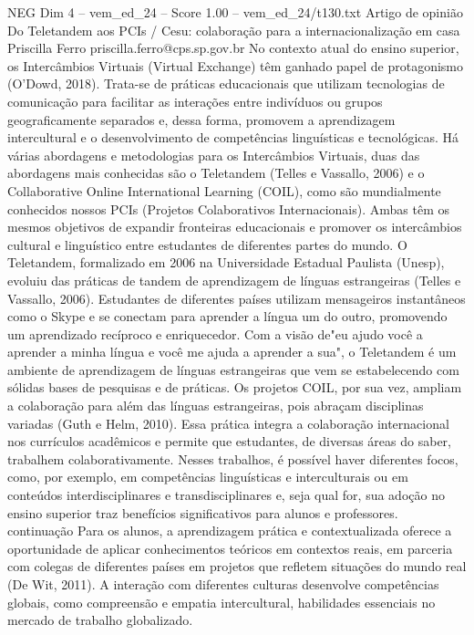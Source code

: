 \begin{textsample}{NEG Dim 4 – vem\_ed\_24 – Score 1.00 – vem\_ed\_24/t130.txt}  \label{ex:f4_neg_063}
Artigo de opinião Do Teletandem aos PCIs / Cesu: colaboração para a internacionalização em casa Priscilla Ferro priscilla.ferro@cps.sp.gov.br No contexto atual do ensino superior, os Intercâmbios Virtuais (Virtual Exchange) têm ganhado papel de protagonismo (O'Dowd, 2018).
Trata-se de práticas educacionais que utilizam tecnologias de comunicação para facilitar as interações entre indivíduos ou grupos geograficamente separados e, dessa forma, promovem a aprendizagem intercultural e o desenvolvimento de competências linguísticas e tecnológicas.
Há várias abordagens e metodologias para os Intercâmbios Virtuais, duas das abordagens mais conhecidas são o Teletandem (Telles e Vassallo, 2006) e o Collaborative Online International Learning (COIL), como são mundialmente conhecidos nossos PCIs (Projetos Colaborativos Internacionais).
Ambas têm os mesmos objetivos de expandir fronteiras educacionais e promover os intercâmbios cultural e linguístico entre estudantes de diferentes partes do mundo.
O Teletandem, formalizado em 2006 na Universidade Estadual Paulista (Unesp), evoluiu das práticas de tandem de aprendizagem de línguas estrangeiras (Telles e Vassallo, 2006).
Estudantes de diferentes países utilizam mensageiros instantâneos como o Skype e se conectam para aprender a língua um do outro, promovendo um aprendizado recíproco e enriquecedor.
Com a visão de"eu ajudo você a aprender a minha língua e você me ajuda a aprender a sua", o Teletandem é um ambiente de aprendizagem de línguas estrangeiras que vem se estabelecendo com sólidas bases de pesquisas e de práticas.
Os projetos COIL, por sua vez, ampliam a colaboração para além das línguas estrangeiras, pois abraçam disciplinas variadas (Guth e Helm, 2010).
Essa prática integra a colaboração internacional nos currículos acadêmicos e permite que estudantes, de diversas áreas do saber, trabalhem colaborativamente.
Nesses trabalhos, é possível haver diferentes focos, como, por exemplo, em competências linguísticas e interculturais ou em conteúdos interdisciplinares e transdisciplinares e, seja qual for, sua adoção no ensino superior traz benefícios significativos para alunos e professores. continuação Para os alunos, a aprendizagem prática e contextualizada oferece a oportunidade de aplicar conhecimentos teóricos em contextos reais, em parceria com colegas de diferentes países em projetos que refletem situações do mundo real (De Wit, 2011).
A interação com diferentes culturas desenvolve competências globais, como compreensão e empatia intercultural, habilidades essenciais no mercado de trabalho globalizado.

\end{textsample}
